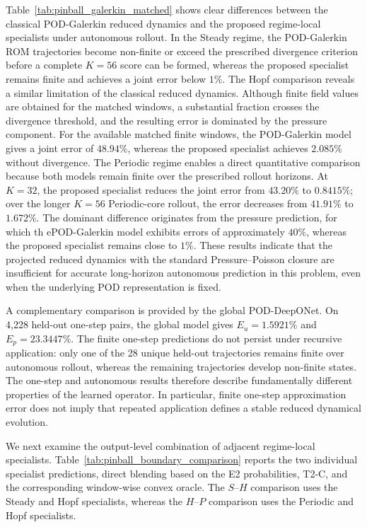 Table~\ref{tab:pinball_galerkin_matched} shows clear differences between
the classical POD-Galerkin reduced dynamics and the
proposed regime-local specialists under autonomous rollout. In the Steady
regime, the POD-Galerkin ROM trajectories become non-finite or exceed the
prescribed divergence criterion before a complete $K=56$ score can be formed,
whereas the proposed specialist remains finite and achieves a joint error
below $1\%$. The Hopf comparison reveals a similar limitation of the classical reduced
dynamics. Although finite field values are obtained for the matched windows,
a substantial fraction crosses the divergence threshold, and the resulting
error is dominated by the pressure component. For the available matched
finite windows, the POD-Galerkin model gives a joint error of $48.94\%$,
whereas the proposed specialist achieves $2.085\%$ without divergence. The Periodic regime enables a direct quantitative comparison because both
models remain finite over the prescribed rollout horizons. At $K=32$, the
proposed specialist reduces the joint error from $43.20\%$ to $0.8415\%$;
over the longer $K=56$ Periodic-core rollout, the error decreases from
$41.91\%$ to $1.672\%$. The dominant difference originates from the pressure
prediction, for which th ePOD-Galerkin model exhibits errors of approximately
$40\%$, whereas the proposed specialist remains close to $1\%$. These results
indicate that the projected reduced dynamics with the standard
Pressure--Poisson closure are insufficient for accurate long-horizon
autonomous prediction in this problem, even when the underlying POD
representation is fixed.



A complementary comparison is provided by the global POD-DeepONet. On
4,228 held-out one-step pairs, the global model gives
$E_u=1.5921\%$ and $E_p=23.3447\%$. The finite one-step predictions do not
persist under recursive application: only one of the 28 unique held-out
trajectories remains finite over autonomous rollout, whereas the remaining
trajectories develop non-finite states. The one-step and autonomous results
therefore describe fundamentally different properties of the learned
operator. In particular, finite one-step approximation error does not imply
that repeated application defines a stable reduced dynamical evolution.



We next examine the output-level combination of adjacent regime-local
specialists. Table~\ref{tab:pinball_boundary_comparison} reports the two
individual specialist predictions, direct blending based on the E2
probabilities, T2-C, and the corresponding window-wise convex oracle. The
$S$--$H$ comparison uses the Steady and Hopf specialists, whereas the
$H$--$P$ comparison uses the Periodic and Hopf specialists.

